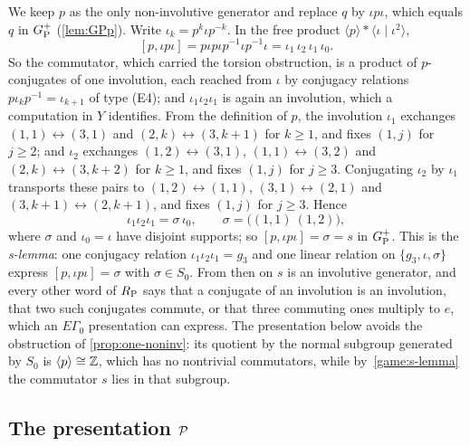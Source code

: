 We keep $p$ as the only non-involutive generator and replace $q$ by $\iota p\iota$, which equals $q$ in $G_{\mathrm P}^{+}$ (\cref{lem:GPp}). Write
$\iota_k=p^k\iota p^{-k}$. In the free product $\langle p\rangle*\langle\iota\mid\iota^2\rangle$,
\[
[p,\iota p\iota]=p\iota p\iota p^{-1}\iota p^{-1}\iota=\iota_1\,\iota_2\,\iota_1\,\iota_0 .
\]
So the commutator, which carried the torsion obstruction, is a product of $p$-conjugates of one involution, each reached from $\iota$ by
conjugacy relations $p\iota_kp^{-1}=\iota_{k+1}$ of type (E4); and $\iota_1\iota_2\iota_1$ is again an involution, which a computation in
$Y$ identifies. From the definition of $p$, the involution $\iota_1$ exchanges $(1,1)\leftrightarrow(3,1)$ and $(2,k)\leftrightarrow(3,k+1)$
for $k\ge1$, and fixes $(1,j)$ for $j\ge2$; and $\iota_2$ exchanges $(1,2)\leftrightarrow(3,1)$, $(1,1)\leftrightarrow(3,2)$ and
$(2,k)\leftrightarrow(3,k+2)$ for $k\ge1$, and fixes $(1,j)$ for $j\ge3$. Conjugating $\iota_2$ by $\iota_1$ transports these pairs to
$(1,2)\leftrightarrow(1,1)$, $(3,1)\leftrightarrow(2,1)$ and $(3,k+1)\leftrightarrow(2,k+1)$, and fixes $(1,j)$ for $j\ge3$. Hence
\begin{equation}\label{game:s-lemma}
\iota_1\iota_2\iota_1=\sigma\,\iota_0,\qquad\sigma=\bigl((1,1)\ (1,2)\bigr),
\end{equation}
where $\sigma$ and $\iota_0=\iota$ have disjoint supports; so $[p,\iota p\iota]=\sigma=s$ in $G_{\mathrm P}^{+}$. This is the \emph{s-lemma}: one
conjugacy relation $\iota_1\iota_2\iota_1=g_3$ and one linear relation on $\{g_3,\iota,\sigma\}$ express $[p,\iota p\iota]=\sigma$ with
$\sigma\in S_0$. From then on $s$ is an involutive generator, and every other word of $R_{\mathrm P}$ says that a conjugate of an involution is an
involution, that two such conjugates commute, or that three commuting ones multiply to $e$, which an $E\Gamma_0$ presentation can express.
The presentation below avoids the obstruction of \cref{prop:one-noninv}: its quotient by the normal subgroup generated by $S_0$ is
$\langle p\rangle\cong\mathbb Z$, which has no nontrivial commutators, while by~\eqref{game:s-lemma} the commutator $s$ lies in that subgroup.

\subsection{The presentation \texorpdfstring{$\mathcal P$}{P}}

